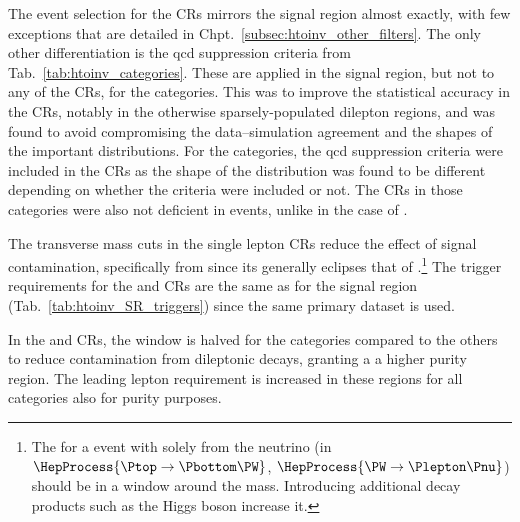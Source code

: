 \medskip

\noindent{}The event selection for the \glspl{CR} mirrors the signal region almost exactly, with few exceptions that are detailed in Chpt.~\ref{subsec:htoinv_other_filters}. The only other differentiation is the \acrshort{qcd} suppression criteria from Tab.~\ref{tab:htoinv_categories}. These are applied in the signal region, but not to any of the \glspl{CR}, for the \ttH categories. This was to improve the statistical accuracy in the \glspl{CR}, notably in the otherwise sparsely-populated dilepton regions, and was found to avoid compromising the data--simulation agreement and the shapes of the important distributions. For the \VH categories, the \acrshort{qcd} suppression criteria were included in the \glspl{CR} as the shape of the \ptmiss distribution was found to be different depending on whether the criteria were included or not. The \glspl{CR} in those categories were also not deficient in events, unlike in the case of \ttH.

The transverse mass cuts in the single lepton \glspl{CR} reduce the effect of signal contamination, specifically from \ttH since its \mT generally eclipses that of \ttbar.\footnote{The \mT for a \ttbar event with \ptvecmiss solely from the neutrino (in $\HepProcess{\Ptop \to \Pbottom\PW}$, $\HepProcess{\PW \to \Plepton\Pnu}$) should be in a window around the \PW mass. Introducing additional decay products such as the Higgs boson increase it.} The trigger requirements for the \singleMuCr and \doubleMuCr \glspl{CR} are the same as for the signal region (Tab.~\ref{tab:htoinv_SR_triggers}) since the same primary dataset is used.

In the \doubleMuCr and \doubleEleCr \glspl{CR}, the \doubleLepMass window is halved for the \ttH categories compared to the others to reduce contamination from dileptonic \ttbar decays, granting a a higher purity \ztolplmpjets region. The leading lepton \pt requirement is increased in these regions for all categories also for purity purposes.

